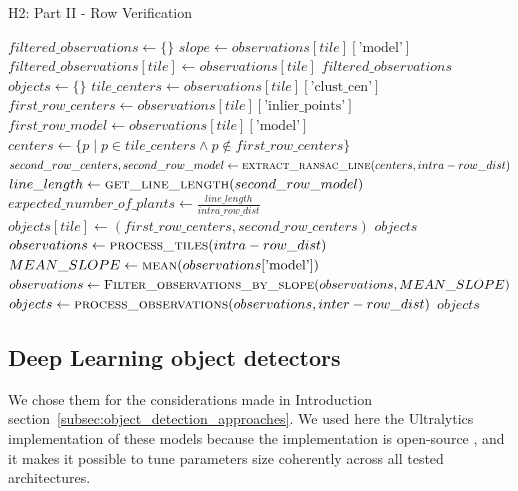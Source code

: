 \documentclass[12pt,a4paper,oneside]{report}
\begin{document}
  \begin{algorithm}
  \caption{H2: Part II - Row Verification}
  \label{alg:H2_part2}
  \begin{algorithmic}[1]
    \State $filtered\_observations \gets \{\}$
      \State $slope \gets observations[tile][\text{'model'}]$
        \State $filtered\_observations[tile] \gets observations[tile]$
      \EndIf
    \EndFor
    \State \Return $filtered\_observations$
  \EndFunction
    \State $objects \gets \{\}$
      \State $tile\_centers \gets observations[tile][\text{'clust\_cen'}]$
      \State $first\_row\_centers \gets observations[tile][\text{'inlier\_points'}]$
      \State $first\_row\_model \gets observations[tile][\text{'model'}]$
      \State $centers \gets \{p \mid p \in tile\_centers \land p \notin first\_row\_centers\}$
      \State $second\_row\_centers, second\_row\_model \gets \Call{extract\_ransac\_line}{centers, intra-row\_dist}$
      \State $line\_length \gets \Call{get\_line\_length}{second\_row\_model}$
      \State $expected\_number\_of\_plants \gets \frac{line\_length}{intra\_row\_dist}$
            \State $objects[tile] \gets (first\_row\_centers, second\_row\_centers)$
          \EndIf
        \EndIf
      \EndIf
    \EndFor
    \State \Return $objects$
  \EndFunction
    \State $observations \gets \Call{process\_tiles}{intra-row\_dist}$
    \State $MEAN\_SLOPE \gets \Call{mean}{observations[\text{'model'}]}$
    \State $observations \gets \Call{Filter\_observations\_by\_slope}{observations,MEAN\_SLOPE}$
    \State $objects \gets \Call{process\_observations}{observations,inter-row\_dist}$
    \State \Return $objects$
  \EndFunction
  \end{algorithmic}
  \end{algorithm}

\subsection{Deep Learning object detectors}

We chose them for the considerations made in Introduction section~\ref{subsec:object_detection_approaches}.
We used here the Ultralytics implementation of these models because the implementation is open-source \cite{jocherGitHubUltralyticsYOLO2023},
and it makes it possible to tune parameters size coherently across all tested architectures.
\end{document}
